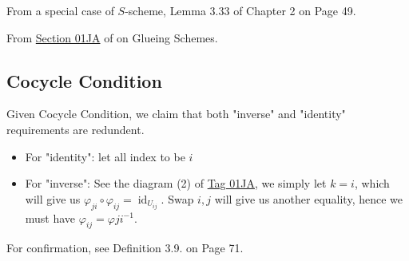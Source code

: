 From a special case of $S$-scheme, \cite{qing2006algebraic} Lemma 3.33 of Chapter 2 on Page 49.

From \href{https://stacks.math.columbia.edu/tag/01JA}{Section 01JA} of \cite{stacks-project} on Glueing Schemes.

\subsection{Cocycle Condition}
Given Cocycle Condition, we claim that both "inverse" and "identity" requirements are redundent. 
\begin{itemize}

\item For "identity": let all index to be $i$
\item For "inverse": See the diagram (2) of \href{https://stacks.math.columbia.edu/tag/01JA}{Tag 01JA}, we simply let $k=i$, which will give us $\varphi_{ji}\circ\varphi_{ij}=\operatorname{id}_{U_{ij}}$. Swap $i,j$ will give us another equality, hence we must have $\varphi_{ij}=\varphi{ji}^{-1}$.
\end{itemize}

For confirmation, see \cite{gortz2020algebraic} Definition 3.9. on Page 71.